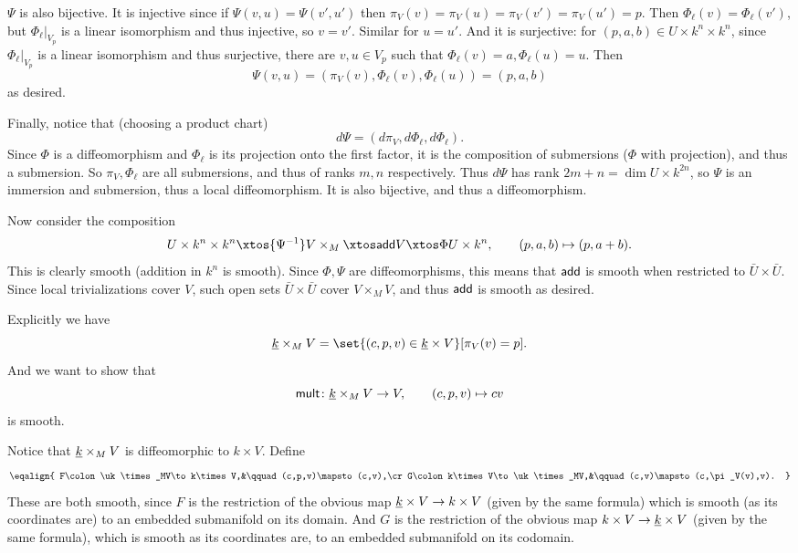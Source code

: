     $\Psi$ is also bijective.
    It is injective since if $\Psi(v,u)=\Psi(v',u')$ then $\pi_V(v)=\pi_V(u)=\pi_V(v')=\pi_V(u')=p$.
    Then $\Phi_\ell(v)=\Phi_\ell(v')$, but $\Phi_\ell|_{V_p}$ is a linear isomorphism and thus injective, so $v=v'$.
    Similar for $u=u'$.
    And it is surjective: for $(p,a,b)\in U\times k^n\times k^n$, since $\Phi_\ell|_{V_p}$ is a linear isomorphism and
    thus surjective, there are $v,u\in V_p$ such that $\Phi_\ell(v)=a,\Phi_\ell(u)=u$.
    Then
    $$ \Psi(v,u) = (\pi_V(v),\Phi_\ell(v),\Phi_\ell(u)) = (p,a,b) $$
    as desired.

    Finally, notice that (choosing a product chart)
    $$ d\Psi = (d\pi_V,d\Phi_\ell,d\Phi_\ell) . $$
    Since $\Phi$ is a diffeomorphism and $\Phi_\ell$ is its projection onto the first factor, it is the composition of
    submersions ($\Phi$ with projection), and thus a submersion.
    So $\pi_V,\Phi_\ell$ are all submersions, and thus of ranks $m,n$ respectively.
    Thus $d\Psi$ has rank $2m+n=\dim U\times k^{2n}$, so $\Psi$ is an immersion and submersion, thus a local diffeomorphism.
    It is also bijective, and thus a diffeomorphism.

    Now consider the composition
    $$ U\times k^n\times k^n \xtos{\Psi^{-1}} V\times_M \xtos\add V \xtos\Phi U\times k^n,\qquad (p,a,b)\mapsto(p,a+b) . $$
    This is clearly smooth (addition in $k^n$ is smooth).
    Since $\Phi,\Psi$ are diffeomorphisms, this means that ${\sf add}$ is smooth when restricted to $\bar U\times\bar U$.
    Since local trivializations cover $V$, such open sets $\bar U\times\bar U$ cover $V\times_MV$, and thus ${\sf add}$ is smooth
    as desired.

    \item \def\mult{{\sf mult}}
    Explicitly we have
    $$ \uk\times_MV = \set{(c,p,v)\in\uk\times V}[\pi_V(v)=p] . $$
    And we want to show that
    $$ \mult\colon\uk\times_MV \to V,\qquad (c,p,v)\mapsto cv $$
    is smooth.

    Notice that $\underline k\times_MV$ is diffeomorphic to $k\times V$.
    Define
    $$ \eqalign{
        F\colon\uk\times_MV\to k\times V,&\qquad (c,p,v)\mapsto(c,v),\cr
        G\colon k\times V\to\uk\times_MV,&\qquad (c,v)\mapsto(c,\pi_V(v),v).
    } $$
    These are both smooth, since $F$ is the restriction of the obvious map $\underline k\times V\to k\times V$ (given by the same
    formula) which is smooth (as its coordinates are) to an embedded submanifold on its domain.
    And $G$ is the restriction of the obvious map $k\times V\to\underline k\times V$ (given by the same formula), which is smooth as
    its coordinates are, to an embedded submanifold on its codomain.

